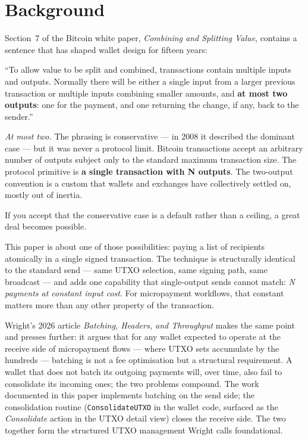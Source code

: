 \documentclass[a4paper, 11pt]{article}
\begin{document}
\section{Background}

Section~7 of the Bitcoin white paper, \emph{Combining and Splitting Value}, contains a sentence that has shaped wallet design for fifteen years:

\begin{notebox}
``To allow value to be split and combined, transactions contain multiple inputs and outputs. Normally there will be either a single input from a larger previous transaction or multiple inputs combining smaller amounts, and \textbf{at most two outputs}: one for the payment, and one returning the change, if any, back to the sender.''
\end{notebox}

\emph{At most two.} The phrasing is conservative --- in 2008 it described the dominant case --- but it was never a protocol limit. Bitcoin transactions accept an arbitrary number of outputs subject only to the standard maximum transaction size. The protocol primitive is \textbf{a single transaction with N outputs}. The two-output convention is a custom that wallets and exchanges have collectively settled on, mostly out of inertia.

If you accept that the conservative case is a default rather than a ceiling, a great deal becomes possible.

This paper is about one of those possibilities: paying a list of recipients atomically in a single signed transaction. The technique is structurally identical to the standard send --- same UTXO selection, same signing path, same broadcast --- and adds one capability that single-output sends cannot match: \emph{N payments at constant input cost}. For micropayment workflows, that constant matters more than any other property of the transaction.

Wright's 2026 article \emph{Batching, Headers, and Throughput} makes the same point and presses further: it argues that for any wallet expected to operate at the receive side of micropayment flows --- where UTXO sets accumulate by the hundreds --- batching is not a fee optimisation but a structural requirement. A wallet that does not batch its outgoing payments will, over time, also fail to consolidate its incoming ones; the two problems compound. The work documented in this paper implements batching on the send side; the consolidation routine (\texttt{ConsolidateUTXO} in the wallet code, surfaced as the \emph{Consolidate} action in the UTXO detail view) closes the receive side. The two together form the structured UTXO management Wright calls foundational.
\end{document}
